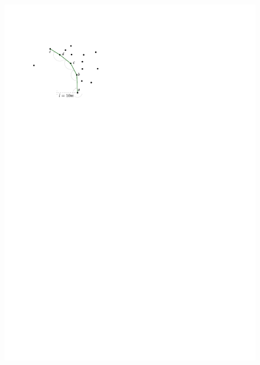 \begin{marginfigure}
  \centering
  \begin{subfigure}[b]{.9\linewidth}
    \centering
    \includegraphics[page=4,width=\textwidth]{figs/movingarm.pdf}
    \caption{}
  \end{subfigure}
  \qquad
  \begin{subfigure}[b]{.9\linewidth}
    \centering

\end{subfigure}
\end{marginfigure}
